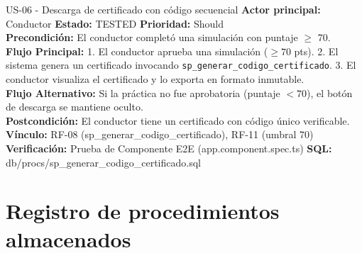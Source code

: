 \documentclass[11pt,a4paper]{article}
\begin{document}
\begin{requisito}{US-06 - Descarga de certificado con código secuencial}
    \textbf{Actor principal:} Conductor \quad \textbf{Estado:} TESTED \quad \textbf{Prioridad:} Should\\[0.2cm]
    \textbf{Precondición:} El conductor completó una simulación con puntaje $\geq$ 70.\\[0.2cm]
    \textbf{Flujo Principal:} 1. El conductor aprueba una simulación ($\geq 70$ pts). 2. El sistema genera un certificado invocando \texttt{sp\_generar\_codigo\_certificado}. 3. El conductor visualiza el certificado y lo exporta en formato inmutable. \\[0.2cm]
    \textbf{Flujo Alternativo:} Si la práctica no fue aprobatoria (puntaje $< 70$), el botón de descarga se mantiene oculto.\\[0.2cm]
    \textbf{Postcondición:} El conductor tiene un certificado con código único verificable. \\[0.2cm]
    \textbf{Vínculo:} RF-08 (sp\_generar\_codigo\_certificado), RF-11 (umbral 70) \\[0.2cm]
    \textbf{Verificación:} Prueba de Componente E2E (app.component.spec.ts) \quad \textbf{SQL:} db/procs/sp\_generar\_codigo\_certificado.sql
\end{requisito}

\newpage
\section{Registro de procedimientos almacenados}
\end{document}
